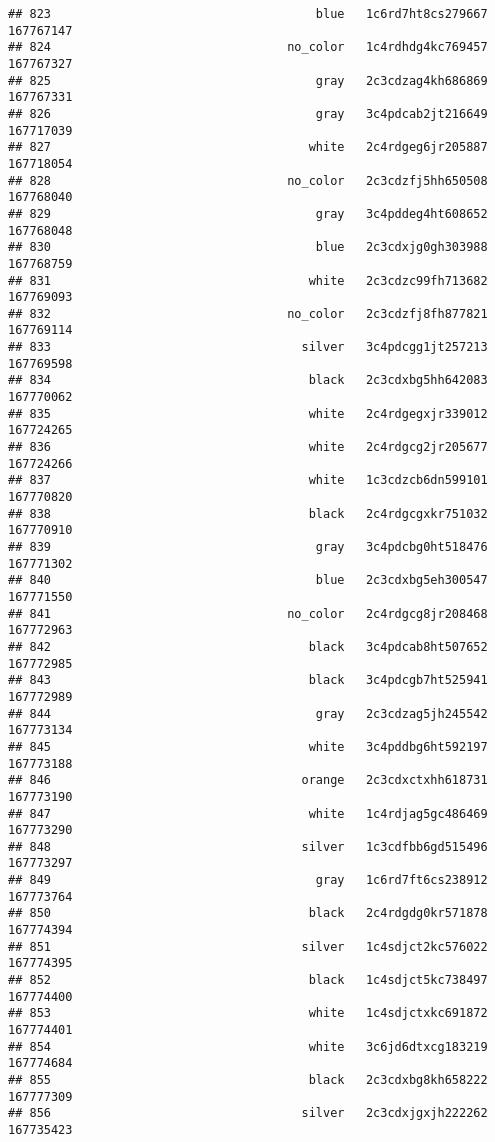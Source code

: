 \documentclass[
]{article}
\begin{document}
\begin{verbatim}
## 823                                     blue   1c6rd7ht8cs279667 167767147
## 824                                 no_color   1c4rdhdg4kc769457 167767327
## 825                                     gray   2c3cdzag4kh686869 167767331
## 826                                     gray   3c4pdcab2jt216649 167717039
## 827                                    white   2c4rdgeg6jr205887 167718054
## 828                                 no_color   2c3cdzfj5hh650508 167768040
## 829                                     gray   3c4pddeg4ht608652 167768048
## 830                                     blue   2c3cdxjg0gh303988 167768759
## 831                                    white   2c3cdzc99fh713682 167769093
## 832                                 no_color   2c3cdzfj8fh877821 167769114
## 833                                   silver   3c4pdcgg1jt257213 167769598
## 834                                    black   2c3cdxbg5hh642083 167770062
## 835                                    white   2c4rdgegxjr339012 167724265
## 836                                    white   2c4rdgcg2jr205677 167724266
## 837                                    white   1c3cdzcb6dn599101 167770820
## 838                                    black   2c4rdgcgxkr751032 167770910
## 839                                     gray   3c4pdcbg0ht518476 167771302
## 840                                     blue   2c3cdxbg5eh300547 167771550
## 841                                 no_color   2c4rdgcg8jr208468 167772963
## 842                                    black   3c4pdcab8ht507652 167772985
## 843                                    black   3c4pdcgb7ht525941 167772989
## 844                                     gray   2c3cdzag5jh245542 167773134
## 845                                    white   3c4pddbg6ht592197 167773188
## 846                                   orange   2c3cdxctxhh618731 167773190
## 847                                    white   1c4rdjag5gc486469 167773290
## 848                                   silver   1c3cdfbb6gd515496 167773297
## 849                                     gray   1c6rd7ft6cs238912 167773764
## 850                                    black   2c4rdgdg0kr571878 167774394
## 851                                   silver   1c4sdjct2kc576022 167774395
## 852                                    black   1c4sdjct5kc738497 167774400
## 853                                    white   1c4sdjctxkc691872 167774401
## 854                                    white   3c6jd6dtxcg183219 167774684
## 855                                    black   2c3cdxbg8kh658222 167777309
## 856                                   silver   2c3cdxjgxjh222262 167735423

\end{verbatim}
\end{document}
